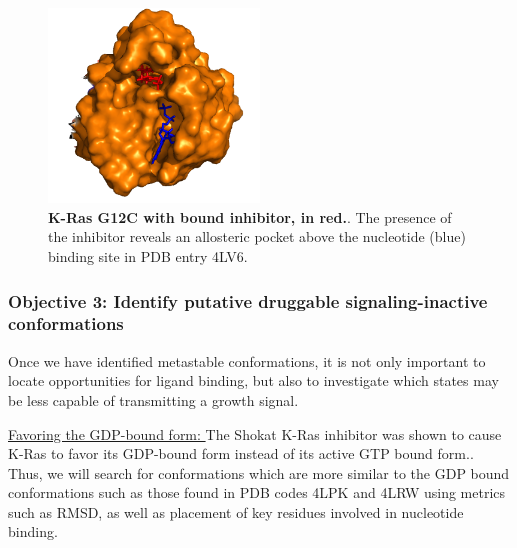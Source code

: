 \documentclass[12pt]{article}
\begin{document}
  \begin{figure}[H]
  \centering
  \includegraphics[width=0.5\textwidth]{4LV6.png}
  \caption{\textbf{K-Ras G12C with bound inhibitor, in red.}\cite{ostrem2013}. The presence of the inhibitor reveals an allosteric pocket above the nucleotide (blue) binding site in PDB entry 4LV6.}
  \label{shokatfig}
  \end{figure} 

  \subsubsection*{Objective 3: Identify putative druggable signaling-inactive conformations}
  Once we have identified metastable conformations, it is not only important to locate opportunities for ligand binding, but also to investigate which states may be less capable of transmitting a growth signal.
  
  \underline{Favoring the GDP-bound form: } The Shokat K-Ras inhibitor was shown to cause K-Ras to favor its GDP-bound form instead of its active GTP bound form.\cite{ostrem2013}. Thus, we will search for conformations which are more similar to the GDP bound conformations such as those found in PDB codes 4LPK and 4LRW using metrics such as RMSD, as well as placement of key residues involved in nucleotide binding.
  
\end{document}
